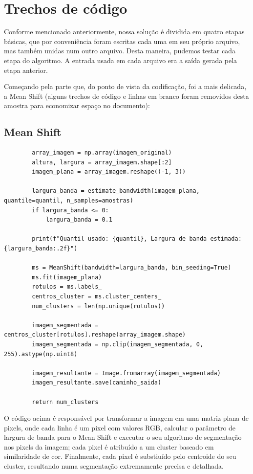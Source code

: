 \documentclass{article}
\begin{document}
\section{Trechos de código}

Conforme mencionado anteriormente, nossa solução é dividida em quatro etapas básicas, que por conveniência foram escritas cada uma em seu próprio arquivo, mas também unidas num outro arquivo. Desta maneira, pudemos testar cada etapa do algoritmo. A entrada usada em cada arquivo era a saída gerada pela etapa anterior.

Começando pela parte que, do ponto de vista da codificação, foi a mais delicada, a Mean Shift (alguns trechos de código e linhas em branco foram removidos desta amostra para economizar espaço no documento):

\subsection{Mean Shift}

\begin{verbatim}
        array_imagem = np.array(imagem_original)
        altura, largura = array_imagem.shape[:2]
        imagem_plana = array_imagem.reshape((-1, 3))

        largura_banda = estimate_bandwidth(imagem_plana, quantile=quantil, n_samples=amostras)
        if largura_banda <= 0:
            largura_banda = 0.1

        print(f"Quantil usado: {quantil}, Largura de banda estimada: {largura_banda:.2f}")

        ms = MeanShift(bandwidth=largura_banda, bin_seeding=True)
        ms.fit(imagem_plana)
        rotulos = ms.labels_
        centros_cluster = ms.cluster_centers_
        num_clusters = len(np.unique(rotulos))

        imagem_segmentada = centros_cluster[rotulos].reshape(array_imagem.shape)
        imagem_segmentada = np.clip(imagem_segmentada, 0, 255).astype(np.uint8)

        imagem_resultante = Image.fromarray(imagem_segmentada)
        imagem_resultante.save(caminho_saida)

        return num_clusters
\end{verbatim}

O código acima é responsável por transformar a imagem em uma matriz plana de pixels, onde cada linha é um pixel com valores RGB, calcular o parâmetro de largura de banda para o Mean Shift e executar o seu algoritmo de segmentação nos pixels da imagem; cada pixel é atribuído a um cluster baseado em similaridade de cor. Finalmente, cada pixel é substiuído pelo centroide do seu cluster, resultando numa segmentação extremamente precisa e detalhada.
\end{document}
